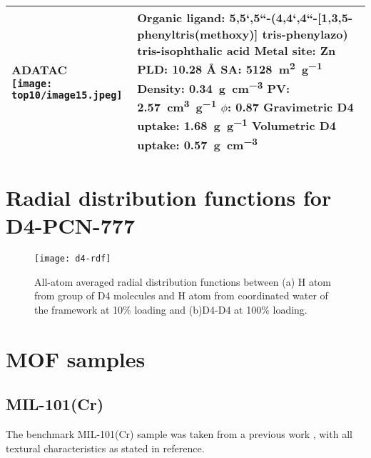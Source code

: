 {\begin{longtable}[]{@{}p{5cm}p{12cm}@{}}
    \midrule
    \makecell{\textbf{ADATAC} \\ \texttt{[image: top10/image15.jpeg]}}
    & \makecell[l]{
        \textbf{Organic ligand:} \\
        5,5`,5``-(4,4`,4``-{[}1,3,5-phenyltris(methoxy){]} tris-phenylazo) tris-isophthalic acid \\
        \textbf{Metal site:} Zn \\
        \textbf{PLD:} 10.28 Å \\
        \textbf{SA:} \SI{5128}{\metre\squared\per\gram} \\
        \textbf{Density:} \SI{0.34}{\gram\per\centi\metre\cubed} \\
        \textbf{PV:} \SI{2.57}{\centi\metre\cubed\per\gram} \\
        \textbf{\(\phi\):} 0.87 \\
        \textbf{Gravimetric D4 uptake:} \SI{1.68}{\gram\per\gram} \\
        \textbf{Volumetric D4 uptake:} \SI{0.57}{\gram\per\centi\metre\cubed}}\\
    \bottomrule
\end{longtable}
}

\section{Radial distribution functions for D4-PCN-777}\label{si-radial-distribution}

\begin{figure}[H]
    \centering
    \texttt{[image: d4-rdf]}
    \caption{%
        All-atom averaged radial distribution functions between (a) H atom from
         group of D4 molecules and H atom from coordinated water of the
        framework at 10\% loading and (b)D4-D4 at 100\% loading.
        }\label{fig:d4-rdf}
\end{figure}

\pagebreak

\section{MOF samples}\label{mof-samples}

\subsection{MIL-101(Cr)}

The benchmark MIL-101(Cr) sample was taken from a previous work
\citep{pillaiCapturePerformancesHybrid2017}, with all textural characteristics
as stated in reference.

